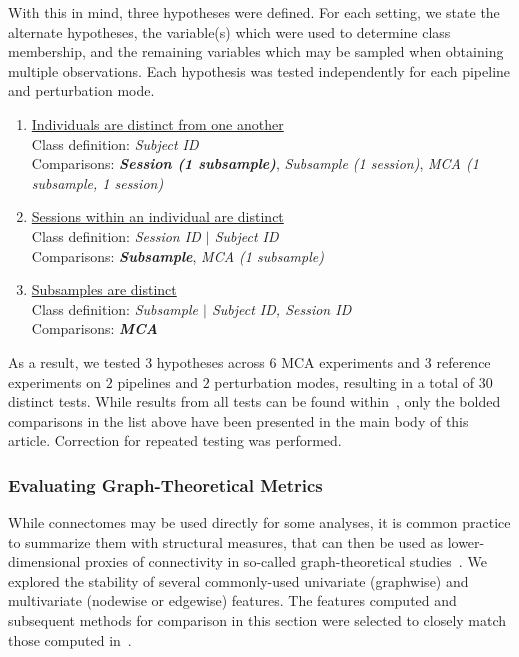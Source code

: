 \documentclass[fleqn,10pt]{SelfArx} %
\newcommand{\new}[1]{{#1}}
\begin{document}
With this in mind, three hypotheses were defined. For each setting, we state the alternate hypotheses, the variable(s)
which were used to determine class membership, and the remaining variables which may be sampled when obtaining multiple
observations. Each hypothesis was tested independently for each pipeline and perturbation mode.

\begin{enumerate}[label=$H_{A\arabic*}$:]
\item \underline{Individuals are distinct from one another}\\
Class definition: \textit{Subject ID}\\
Comparisons: \textbf{\textit{Session (1 subsample)}}, \textit{Subsample (1 session)},
\textit{MCA (1 subsample, 1 session)}
\item \underline{Sessions within an individual are distinct}\\
Class definition: \textit{Session ID $\vert$ Subject ID}\\
Comparisons: \textbf{\textit{Subsample}}, \textit{MCA (1 subsample)}
\item \underline{Subsamples are distinct}\\
Class definition: \textit{Subsample $\vert$ Subject ID, Session ID}\\
Comparisons: \textbf{\textit{MCA}}
\end{enumerate}

As a result, we tested $3$ hypotheses across $6$ MCA experiments and $3$ reference experiments on $2$ pipelines and $2$
perturbation modes, resulting in a total of $30$ distinct tests. \new{While results from all tests can be found
within~\sref{supsec:discrimfull}, only the bolded comparisons in the list above have been presented in the main body of
this article. Correction for repeated testing was performed.}

\subsubsection*{Evaluating Graph-Theoretical Metrics}
While connectomes may be used directly for some analyses, it is common practice to summarize them with structural
measures, that can then be used as lower-dimensional proxies of connectivity in so-called graph-theoretical
studies~\cite{Rubinov2010-fh}. We explored the stability of several commonly-used univariate (graphwise) and
multivariate (nodewise or edgewise) features. The features computed and subsequent methods for comparison in this
section were selected to closely match those computed in~\cite{Betzel2018-eo}.
\end{document}
